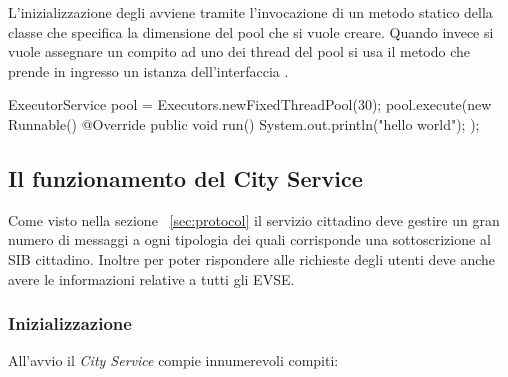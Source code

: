 L'inizializzazione degli  avviene tramite l'invocazione di un metodo statico della classe  che specifica la dimensione del pool che si vuole creare. Quando invece si vuole assegnare un compito ad uno dei thread del pool si usa il metodo  che prende in ingresso un istanza dell'interfaccia .

\begin{java}[caption={Creazione Pool di Thread},label={lst:threadPool}]
ExecutorService pool = Executors.newFixedThreadPool(30);
pool.execute(new Runnable() {
	@Override
	public void run() {
		System.out.println("hello world");
	}
});
\end{java}

\subsection{Il funzionamento del City Service}
 
Come visto nella sezione ~\ref{sec:protocol} il servizio cittadino deve gestire un gran numero di messaggi a ogni tipologia dei quali corrisponde una sottoscrizione al SIB cittadino. Inoltre per poter rispondere alle richieste degli utenti deve anche avere le informazioni relative a tutti gli EVSE.

\subsubsection{Inizializzazione}\label{subsubsec:city-init}

All'avvio il \emph{City Service} compie innumerevoli compiti:

